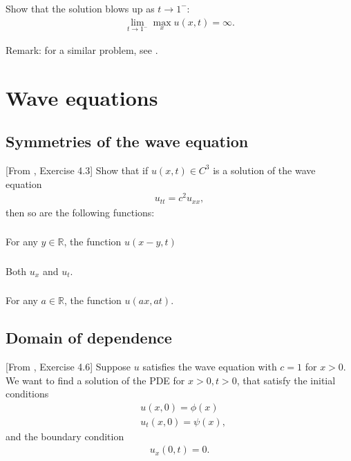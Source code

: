 \documentclass[11pt,letterpaper]{report}
\begin{document}
\subsection{}
Show that the solution blows up as $t\to 1^-$:
\begin{align}
    \lim_{t\to 1^-} \max_x u(x,t) = \infty.
\end{align}

Remark: for a similar problem, see \cite[Exercise 2.2.11]{Olver_14}.

\chapter{Wave equations}
\section{Symmetries of the wave equation}
[From \cite{ShearerLevy_15}, Exercise 4.3] Show that if $u(x,t)\in C^3$ is a solution of the wave equation
\begin{align}
    u_{tt} = c^2u_{xx},
\end{align}
then so are the following functions:

\subsection{}
For any $y\in\mathbb{R}$, the function $u(x-y,t)$

\subsection{}
Both $u_x$ and $u_t$.

\subsection{}
For any $a\in\mathbb{R}$, the function $u(ax,at)$. 

\section{Domain of dependence}
[From \cite{ShearerLevy_15}, Exercise 4.6] Suppose $u$ satisfies the wave equation with $c=1$ for $x>0$. We want to find a solution of the PDE for $x>0, t>0$, that satisfy the initial conditions
\begin{align}
    & u(x,0) = \phi(x)\\
    & u_t(x,0) = \psi(x),
\end{align}
and the boundary condition
\begin{align}
    u_x(0,t) = 0.
\end{align}
\end{document}

